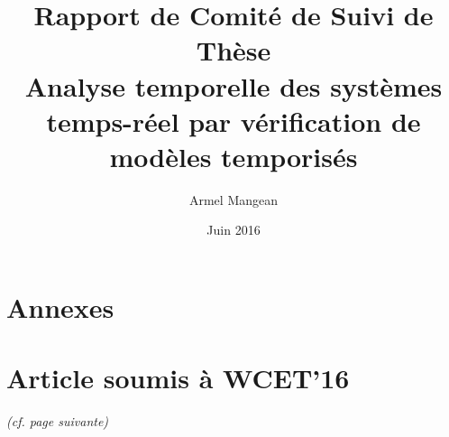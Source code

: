 \documentclass{article}
\title{%
  Rapport de Comité de Suivi de Thèse \\
  {\bf Analyse temporelle des systèmes temps-réel %
    par vérification de modèles temporisés}}
\author{Armel Mangean}
\date{Juin 2016}
\begin{document}
  \maketitle
  \tableofcontents

  
  
  
  

  

  \appendix\vfill
  

  \section*{\huge Annexes}
  \section{Article soumis à WCET'16}
  \label{sec:wcet16}
  \emph{(cf. page suivante)}\vfill
  
\end{document}

